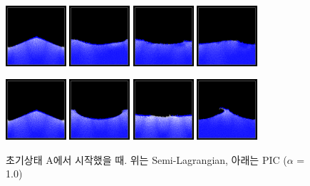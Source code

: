 \documentclass[11pt, A4]{article}
\begin{document}
\begin{figure}[h!]
  \centering
\includegraphics[width=0.20\textwidth]{semilag-state-a/img1}
\includegraphics[width=0.20\textwidth]{semilag-state-a/img2}
\includegraphics[width=0.20\textwidth]{semilag-state-a/img3}
\includegraphics[width=0.20\textwidth]{semilag-state-a/img4}

\includegraphics[width=0.20\textwidth]{pic-state-a/img1}
\includegraphics[width=0.20\textwidth]{pic-state-a/img2}
\includegraphics[width=0.20\textwidth]{pic-state-a/img3}
\includegraphics[width=0.20\textwidth]{pic-state-a/img4}
  \caption{초기상태 A에서 시작했을 때. 위는 Semi-Lagrangian, 아래는 PIC ($\alpha$ = 1.0)}
  \label{fluid-a}
\end{figure}
\end{document}
